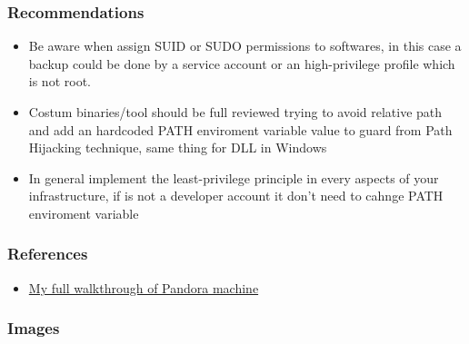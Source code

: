 \documentclass[a4paper]{article}
\def\tightlist{}
\begin{document}
          \subsubsection{Recommendations}

      \begin{itemize}
\tightlist
\item
  Be aware when assign SUID or SUDO permissions to softwares, in this case a backup could be done by a service account or an high-privilege profile which is not root.
\item
  Costum binaries/tool should be full reviewed trying to avoid relative path and add an hardcoded PATH enviroment variable value to guard from Path Hijacking technique, same thing for DLL in Windows
\item
  In general implement the least-privilege principle in every aspects of your infrastructure, if is not a developer account it don't need to cahnge PATH enviroment variable
\end{itemize}

    
          \subsubsection{References}

      \begin{itemize}
\tightlist
\item
  \href{https://github.com/alstephh/This_Is_Just_A_Hobby/tree/main/MACHINES/HTB/Pandora}{My full walkthrough of Pandora machine}
\end{itemize}

    
          \subsubsection{Images}
      
\end{document}

